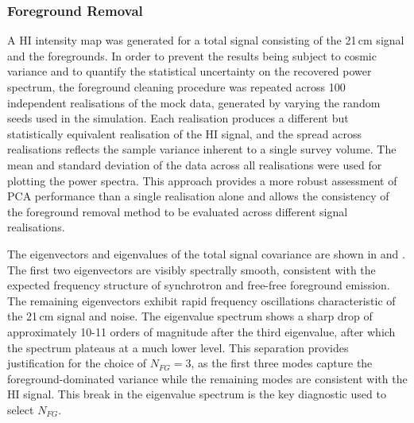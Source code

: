 \subsubsection{Foreground Removal}

A HI intensity map was generated for a total signal consisting of the 21\,cm signal and the foregrounds. In order to prevent the results being subject to cosmic variance and to quantify the statistical uncertainty on the recovered power spectrum, the foreground cleaning procedure was repeated across 100 independent realisations of the mock data, generated by varying the random seeds used in the simulation. Each realisation produces a different but statistically equivalent realisation of the HI signal, and the spread across realisations reflects the sample variance inherent to a single survey volume. The mean and standard deviation of the data across all realisations were used for plotting the power spectra. This approach provides a more robust assessment of PCA performance than a single realisation alone and allows the consistency of the foreground removal method to be evaluated across different signal realisations.

The eigenvectors and eigenvalues of the total signal covariance are shown in  and . The first two eigenvectors are visibly spectrally smooth, consistent with the expected frequency structure of synchrotron and free-free foreground emission. The remaining eigenvectors exhibit rapid frequency oscillations characteristic of the 21\,cm signal and noise. The eigenvalue spectrum shows a sharp drop of approximately 10-11 orders of magnitude after the third eigenvalue, after which the spectrum plateaus at a much lower level. This separation provides justification for the choice of $N_{FG} = 3$, as the first three modes capture the foreground-dominated variance while the remaining modes are consistent with the HI signal. This break in the eigenvalue spectrum is the key diagnostic used to select $N_{FG}$.



